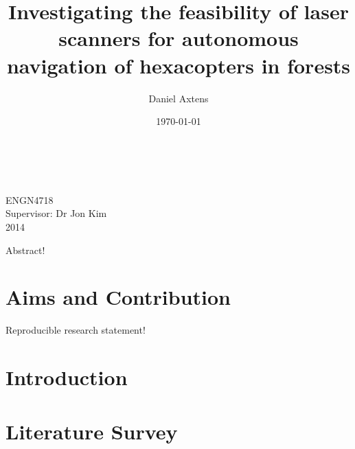 \documentclass[12pt,oneside,a4paper]{book}
\title{Investigating the feasibility of laser scanners for autonomous
  navigation of hexacopters in forests}
\author{Daniel Axtens}
\date{\today}
\begin{document}
\pagestyle{empty}
\thispagestyle{empty}

\begin{titlepage}
  \enlargethispage{2cm}
  \begin{center}
    \makeatletter
    \Huge\textbf{\@title} \\[2.9cm]
    \huge\textbf{\@author} \\[10.5cm]
    \makeatother
    \LARGE ENGN4718\\
    Supervisor: Dr Jon Kim\\[2cm]
    2014
  \end{center}
\end{titlepage}


%

%

%

\cleardoublepage
\pagestyle{headings}
%
Abstract!
\cleardoublepage
\pagestyle{headings}
\tableofcontents

\mainmatter

\chapter{Aims and Contribution}
\label{cha:aims}

Reproducible research statement!

\chapter{Introduction}
\label{cha:intro}

\chapter{Literature Survey}
\label{cha:litsurvey}
\end{document}
